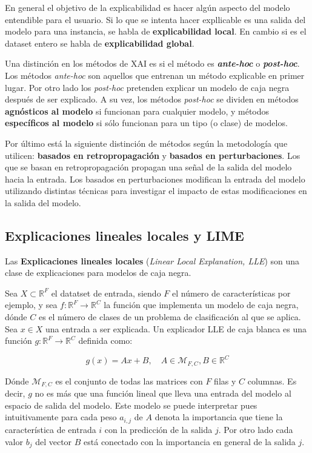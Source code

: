 En general el objetivo de la explicabilidad es hacer algún aspecto del modelo entendible para el usuario. Si lo que se intenta hacer expllicable es una salida del modelo para una instancia, se habla de \textbf{explicabilidad local}. En cambio si es el dataset entero se habla de \textbf{explicabilidad global}.

Una distinción en los métodos de XAI es si el método es \textit{\textbf{ante-hoc}} o \textit{\textbf{post-hoc}}. Los métodos \textit{ante-hoc} son aquellos que entrenan un método explicable en primer lugar. Por otro lado los \textit{post-hoc} pretenden explicar un modelo de caja negra después de ser explicado. A su vez, los métodos \textit{post-hoc} se dividen en métodos \textbf{agnósticos al modelo} si funcionan para cualquier modelo, y métodos \textbf{específicos al modelo} si sólo funcionan para un tipo (o clase) de modelos.

Por último está la siguiente distinción de métodos según la metodología que utilicen: \textbf{basados en retropropagación} y \textbf{basados en perturbaciones}. Los que se basan en retropropagación propagan una señal de la salida del modelo hacia la entrada. Los basados en perturbaciones modifican la entrada del modelo utilizando distintas técnicas para investigar el impacto de estas modificaciones en la salida del modelo.


\subsection{Explicaciones lineales locales y LIME} \label{subsec:LIME}

Las \textbf{Explicaciones lineales locales} (\textit{Linear Local Explanation, LLE}) \cite{REVEL,LIME} son una clase de explicaciones para modelos de caja negra.

 Sea $X \subset \mathbb{R}^F$ el datatset de entrada, siendo $F$ el número de características por ejemplo, y sea $f : \mathbb{R}^F \rightarrow \mathbb{R}^C$ la función que implementa un modelo de caja negra, dónde $C$ es el número de clases de un problema de clasificación al que se aplica. Sea $x\in X$ una entrada a ser explicada. Un explicador LLE de caja blanca es una función $g: \mathbb{R}^F \rightarrow \mathbb{R}^C$ definida como:
 
\begin{equation}
g(x) = Ax + B, \quad A \in \mathcal{M}_{F,C}, B \in \mathbb{R}^C
\end{equation}

Dónde $\mathcal{M}_{F,C}$ es el conjunto de todas las matrices con $F$ filas y $C$ columnas. Es decir, $g$ no es más que una función lineal que lleva una entrada del modelo al espacio de salida del modelo. Este modelo se puede interpretar pues intuitivamente para cada peso $a_{i,j}$ de $A$ denota la importancia que tiene la característica de entrada $i$ con la predicción de la salida $j$. Por otro lado cada valor $b_j$ del vector $B$ está conectado con la importancia en general de la salida $j$.

